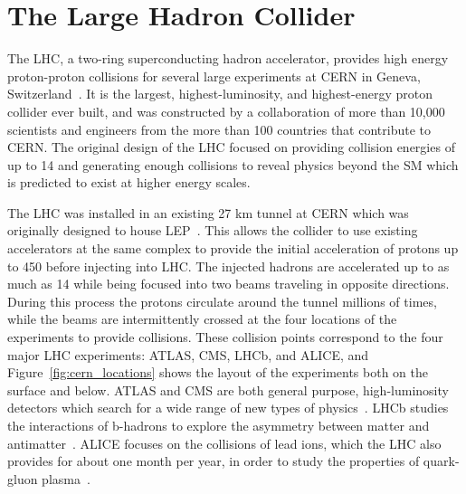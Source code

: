 \chapter{The Large Hadron Collider}

\label{ch:lhc}

The \ac{LHC}, a two-ring superconducting hadron accelerator, provides high energy proton-proton collisions for several large experiments at \ac{CERN} in Geneva, Switzerland~\cite{lhc_machine, lhc_guide}. 
It is the largest, highest-luminosity, and highest-energy proton collider ever built, and was constructed by a collaboration of more than 10,000 scientists and engineers from the more than 100 countries that contribute to \ac{CERN}.
The original design of the \ac{LHC} focused on providing collision energies of up to 14 \TeV and generating enough collisions to reveal physics beyond the \ac{SM} which is predicted to exist at higher energy scales.

The \ac{LHC} was installed in an existing 27 km tunnel at \ac{CERN} which was originally designed to house \ac{LEP}~\cite{lep_tdr}.
This allows the collider to use existing accelerators at the same complex to provide the initial acceleration of protons up to 450 \GeV before injecting into \ac{LHC}.
The injected hadrons are accelerated up to as much as 14 \TeV while being focused into two beams traveling in opposite directions.
During this process the protons circulate around the tunnel millions of times, while the beams are intermittently crossed at the four locations of the experiments to provide collisions.
These collision points correspond to the four major \ac{LHC} experiments: ATLAS, \ac{CMS}, \ac{LHCb}, and \ac{ALICE}, and Figure~\ref{fig:cern_locations} shows the layout of the experiments both on the surface and below.
ATLAS and \ac{CMS} are both general purpose, high-luminosity detectors which search for a wide range of new types of physics~\cite{atlas_experiment, cms_experiment}.
\ac{LHCb} studies the interactions of b-hadrons to explore the asymmetry between matter and antimatter~\cite{lhcb_experiment}.
\ac{ALICE} focuses on the collisions of lead ions, which the \ac{LHC} also provides for about one month per year, in order to study the properties of quark-gluon plasma~\cite{alice_experiment}.

